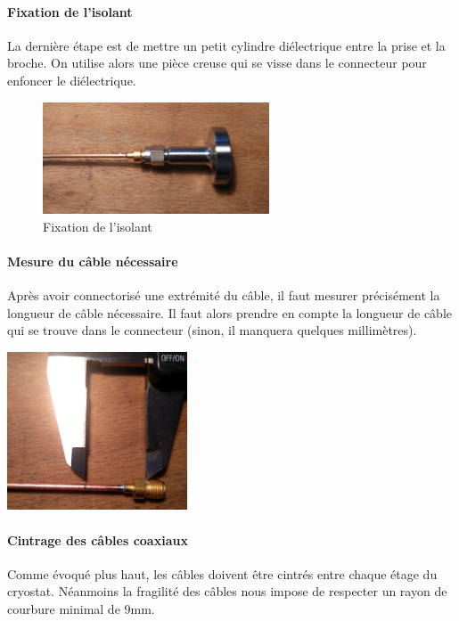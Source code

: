 \paragraph*{Fixation de l’isolant}  La dernière étape est de mettre un petit cylindre diélectrique entre la prise et la broche. On utilise alors une pièce creuse qui se visse dans le connecteur pour enfoncer le diélectrique.

\begin{figure}[h]
    \begin{center}
        \includegraphics[width=0.60\textwidth]{Images/Coax/6}
        \caption{Fixation de l’isolant}
        \label{coax_fixation_isolant}
    \end{center}
\end{figure}

\paragraph*{Mesure du câble nécessaire} Après avoir connectorisé une extrémité du câble, il faut mesurer précisément la longueur de câble nécessaire. Il faut alors prendre en compte la longueur de câble qui se trouve dans le connecteur (sinon, il manquera quelques millimètres).

\begin{center}
    \includegraphics[width=0.40\textwidth]{Images/Coax/mesure}
    \label{coax_mesure}
\end{center}

\newpage
\paragraph*{Cintrage des câbles coaxiaux} Comme évoqué plus haut, les câbles doivent être cintrés entre chaque étage du cryostat. Néanmoins la fragilité des câbles nous impose de respecter un rayon de courbure minimal de 9mm.


